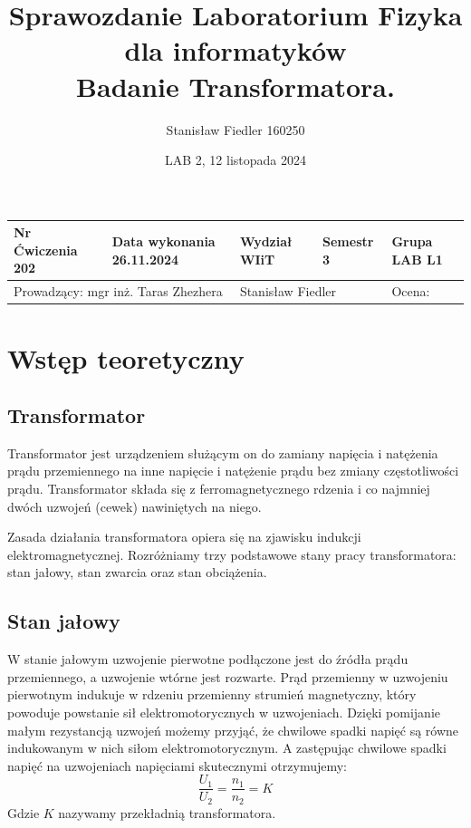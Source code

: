 \documentclass[a4paper, 11pt]{article}
\title{%
        \vspace{-1cm}
       \large Sprawozdanie Laboratorium Fizyka dla informatyków \\
       \huge Badanie Transformatora.}
\author{Stanisław Fiedler 160250}
\date{LAB 2, 12 listopada 2024}
\begin{document}
\begin{table}
	\begin{adjustwidth}{-0.25\textwidth}{-0.25\textwidth}
		\begin{center}
			\begin{tabular}{|l|l|l|l|l|}
				\hline
				Nr Ćwiczenia 202                                             & Data wykonania 26.11.2024                 & Wydział WIiT & Semestr 3 & Grupa LAB L1 \\
				\hline
				\multicolumn{2}{|l|}{ Prowadzący: mgr inż. Taras Zhezhera  } & \multicolumn{2}{|l|}{ Stanisław Fiedler } & Ocena:                                  \\
				\hline
			\end{tabular}
		\end{center}
	\end{adjustwidth}
\end{table}

\maketitle
\tableofcontents

\section{Wstęp teoretyczny}\label{sec:wstep} %
\subsection{Transformator}
Transformator jest urządzeniem służącym on do zamiany napięcia i natężenia prądu przemiennego na inne
napięcie i natężenie prądu bez zmiany częstotliwości prądu.
Transformator składa się z ferromagnetycznego rdzenia i co najmniej dwóch uzwojeń (cewek)
nawiniętych na niego.

Zasada działania transformatora opiera się na zjawisku indukcji elektromagnetycznej. Rozróżniamy trzy
podstawowe stany pracy transformatora: stan jałowy, stan zwarcia oraz stan obciążenia.

\pagebreak
\subsection{Stan jałowy}
W stanie jałowym uzwojenie pierwotne podłączone jest do źródła prądu przemiennego, a uzwojenie wtórne jest rozwarte.
Prąd przemienny w uzwojeniu pierwotnym indukuje w rdzeniu przemienny strumień magnetyczny,
który powoduje powstanie sił elektromotorycznych w uzwojeniach.
Dzięki pomijanie małym rezystancją uzwojeń możemy przyjąć, że chwilowe spadki napięć są równe
indukowanym w nich siłom elektromotorycznym. A zastępując chwilowe spadki napięć na uzwojeniach napięciami skutecznymi otrzymujemy:
\begin{equation}
	\frac{U_1}{U_2} = \frac{n_1}{n_2} = K
\end{equation}
Gdzie $K$ nazywamy przekładnią transformatora.
\end{document}
